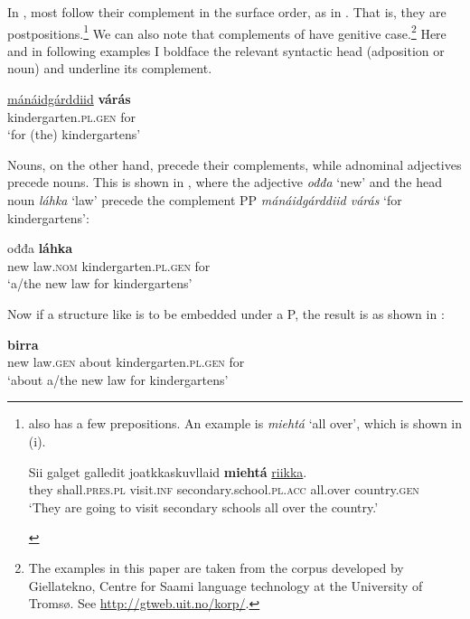 \documentclass[output=paper]{LSP/langsci}
\begin{document}
In , most  follow their complement in the surface order, as in . That is, they are postpositions.\footnote{ also has a few prepositions. An example is \textit{miehtá} ‘all over’, which is shown in (i).
\begin{exe}
 \gll Sii    galget        galledit  joatkkaskuvllaid        \textbf{miehtá}  \ul{riikka}.\\
      they  shall.\textsc{pres.pl}  visit.\textsc{inf} secondary.school.\textsc{pl.acc}  all.over  country.\textsc{gen}\\
 \glt `They are going to visit secondary schools all over the country.’ \end{exe}} We can also note that complements of  have genitive case.\footnote{The examples in this paper are taken from the  corpus developed by Giellatekno, Centre for Saami language technology at the University of Tromsø. See \url{http://gtweb.uit.no/korp/}.} Here and in following examples I boldface the relevant syntactic head (adposition or noun) and underline its complement.

\ea%
    \label{ex:julien:1}
    \gll    \ul{mánáidgárddiid}      \textbf{várás}\\
	    kindergarten.\textsc{pl}.\textsc{gen}    for\\
    \glt   ‘for (the) kindergartens’
    \z
  

Nouns, on the other hand, precede their complements, while adnominal adjectives precede nouns. This is shown in , where the adjective \textit{ođđa} ‘new’ and the head noun \textit{láhka} ‘law’ precede the complement PP \textit{mánáidgárddiid várás} ‘for kindergartens’:

\ea%
    \label{ex:julien:2}
   
    \gll  ođđa  \textbf{láhka}             \\ 
	    new  law.\textsc{nom} kindergarten.\textsc{pl.gen}    for\\
    \glt     ‘a/the new law for kindergartens’
    \z

Now if a structure like  is to be embedded under a P, the result is as shown in :

\ea%
    \label{ex:julien:3}
   
    \gll    {}        \textbf{birra}            \\ 
	    new  law.\textsc{gen}   about    kindergarten.\textsc{pl}.\textsc{gen}    for\\
    \glt    ‘about a/the new law for kindergartens’
\end{document}
